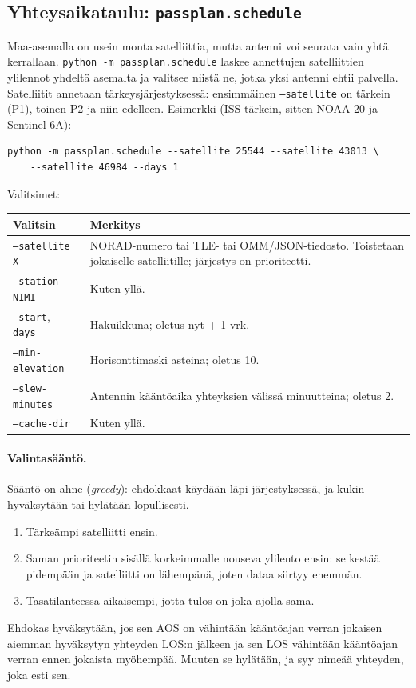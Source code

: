 \documentclass[a4paper,11pt]{article}
\newcommand{\koodi}[1]{\texttt{#1}}
\begin{document}
\subsection{Yhteysaikataulu: \koodi{passplan.schedule}}\label{sec:aikataulu}
Maa-asemalla on usein monta satelliittia, mutta antenni voi seurata vain yhtä kerrallaan.
\koodi{python -m passplan.schedule} laskee annettujen satelliittien ylilennot yhdeltä
asemalta ja valitsee niistä ne, jotka yksi antenni ehtii palvella. Satelliitit annetaan
tärkeysjärjestyksessä: ensimmäinen \koodi{--satellite} on tärkein (P1), toinen P2 ja niin
edelleen. Esimerkki (ISS tärkein, sitten NOAA 20 ja Sentinel-6A):
\begin{verbatim}
python -m passplan.schedule --satellite 25544 --satellite 43013 \
    --satellite 46984 --days 1
\end{verbatim}

\noindent Valitsimet:
\begin{center}
\begin{tabularx}{\textwidth}{@{}lL@{}}
\toprule
Valitsin & Merkitys \\
\midrule
\koodi{--satellite X} & NORAD-numero tai TLE- tai OMM/JSON-tiedosto. Toistetaan jokaiselle
  satelliitille; järjestys on prioriteetti. \\
\koodi{--station NIMI} & Kuten yllä. \\
\koodi{--start}, \koodi{--days} & Hakuikkuna; oletus nyt + 1 vrk. \\
\koodi{--min-elevation} & Horisonttimaski asteina; oletus 10. \\
\koodi{--slew-minutes} & Antennin kääntöaika yhteyksien välissä minuutteina; oletus 2. \\
\koodi{--cache-dir} & Kuten yllä. \\
\bottomrule
\end{tabularx}
\end{center}

\paragraph{Valintasääntö.} Sääntö on ahne (\emph{greedy}): ehdokkaat käydään läpi
järjestyksessä, ja kukin hyväksytään tai hylätään lopullisesti.
\begin{enumerate}
  \item Tärkeämpi satelliitti ensin.
  \item Saman prioriteetin sisällä korkeimmalle nouseva ylilento ensin: se kestää
    pidempään ja satelliitti on lähempänä, joten dataa siirtyy enemmän.
  \item Tasatilanteessa aikaisempi, jotta tulos on joka ajolla sama.
\end{enumerate}
Ehdokas hyväksytään, jos sen AOS on vähintään kääntöajan verran jokaisen aiemman hyväksytyn
yhteyden LOS:n jälkeen ja sen LOS vähintään kääntöajan verran ennen jokaista myöhempää.
Muuten se hylätään, ja syy nimeää yhteyden, joka esti sen.
\end{document}
